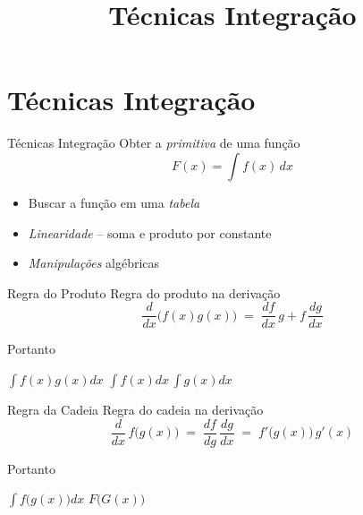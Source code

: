 
\usepackage{integracao_e_series}

\title{Técnicas Integração}



\addtitle

\section{Técnicas Integração}

\begin{frame}{Técnicas Integração}
  Obter a \emph{primitiva} de uma função
  \[
    F(x) = \int f(x)\,dx
  \]
  \pause
  \vspace{-\baselineskip}
  \begin{itemize}[<+->]
    \setlength\itemsep{1em}
    \item Buscar a função em uma \emph{tabela}
    \item \emph{Linearidade} -- soma e produto por constante
    \item \emph{Manipulações} algébricas
  \end{itemize}
\end{frame}

\begin{frame}{Regra do Produto}
  Regra do produto na derivação
  \[
    \frac{d}{dx}\big(f(x)g(x)\big) \;=\; \frac{df}{dx}\,g + f\, \frac{dg}{dx}
  \]

  \pause
  Portanto

  \vspace{5mm}
  \hspace{7mm}
  \(
    \int f(x)g(x)dx
  \)
  \;{\Large\color{red}$\neq$}\;
  \(
    \int f(x)dx\, \int g(x)dx
  \)
\end{frame}

\begin{frame}{Regra da Cadeia}
  Regra do cadeia na derivação
  \[
    \frac{d}{dx} \, f\big(g(x)\big)
    \;=\; \frac{df}{dg}\, \frac{dg}{dx}
    \;=\; f'\big(g(x)\big)\,g'(x)
  \]

  \pause
  Portanto

  \vspace{5mm}
  \hspace{7mm}
  \(
  \int f\big(g(x)\big)dx
  \)
  \;{\Large\color{red}$\neq$}\;
  \(
    F\big(G(x)\big)
  \)
\end{frame}


